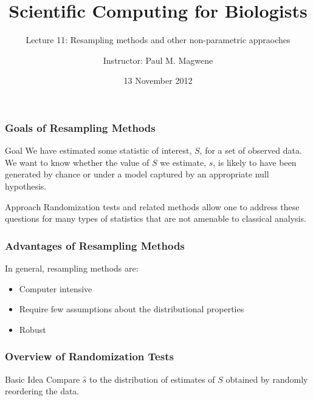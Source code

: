 \documentclass{beamer}
\title{Scientific Computing for Biologists}
\subtitle{Lecture 11: Resampling methods and other non-parametric appraoches} %
\author{Instructor: Paul M. Magwene}
\date{13 November 2012}
\begin{document}
\begin{frame}
\titlepage
\end{frame}



\begin{frame}
  \frametitle{Goals of Resampling Methods}

\begin{block}{Goal}
We have estimated some statistic of interest, $S$, for a set of observed data. We want to know whether the value of $S$ we estimate, $\widehat{s}$, is likely to have been generated by chance or under a model captured by an appropriate null hypothesis.
\end{block}


\begin{block}{Approach}
Randomization tests and related methods allow one to address these questions for many types of statistics that are not amenable to classical analysis.
\end{block}



\end{frame}


\begin{frame}
  \frametitle{Advantages of Resampling Methods}


In general, resampling methods are:
\begin{itemize}
    \item Computer intensive 
    \item Require few assumptions about the distributional properties 
    \item Robust
\end{itemize}

\end{frame}

\begin{frame}
  \frametitle{Overview of Randomization Tests}

\begin{block}{Basic Idea}
Compare $\widehat{s}$ to the distribution of estimates of $S$ obtained by randomly reordering the data.
\end{block}

\end{frame}
\end{document}
